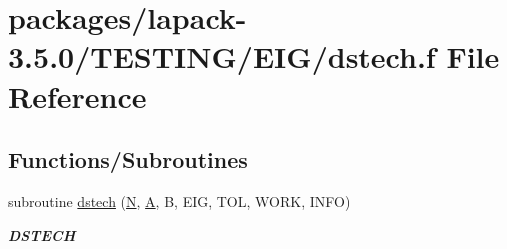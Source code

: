 \hypertarget{dstech_8f}{}\section{packages/lapack-\/3.5.0/\+T\+E\+S\+T\+I\+N\+G/\+E\+I\+G/dstech.f File Reference}
\label{dstech_8f}
\subsection*{Functions/\+Subroutines}
\begin{DoxyCompactItemize}
\item 
subroutine \hyperlink{group__double__eig_gaee97881cc8f081baf0b4bf6bc4abfd46}{dstech} (\hyperlink{polmisc_8c_a0240ac851181b84ac374872dc5434ee4}{N}, \hyperlink{classA}{A}, B, E\+I\+G, T\+O\+L, W\+O\+R\+K, I\+N\+F\+O)
\begin{DoxyCompactList}\small\item\em {\bfseries D\+S\+T\+E\+C\+H} \end{DoxyCompactList}\end{DoxyCompactItemize}
